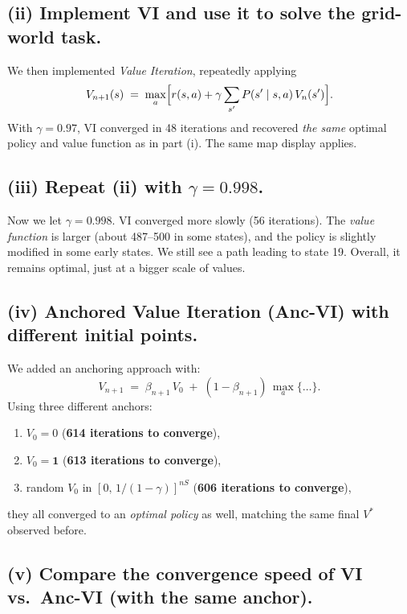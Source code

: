 \subsection*{(ii) Implement VI and use it to solve the grid-world task.}

\noindent
We then implemented \emph{Value Iteration}, repeatedly applying
\[
  V_{n+1}(s) 
   \;=\;\max_{a}\Bigl[r(s,a) + \gamma\sum_{s'}P(s'\mid s,a)\,V_{n}(s')\Bigr].
\]
With \(\gamma=0.97\), VI converged in 48 iterations and recovered \emph{the same} 
optimal policy and value function as in part (i).  The same map display applies.

\subsection*{(iii) Repeat (ii) with \(\gamma=0.998\).}

\noindent
Now we let \(\gamma=0.998\).  VI converged more slowly (56 iterations). 
The \emph{value function} is larger (about 487--500 in some states), 
and the policy is slightly modified in some early states.  
We still see a path leading to state 19. 
Overall, it remains optimal, just at a bigger scale of values.

\subsection*{(iv) Anchored Value Iteration (Anc-VI) with different initial points.}

\noindent
We added an anchoring approach with:
\[
  V_{n+1} 
   \;=\;\beta_{n+1}\,V_0 \;+\;(1-\beta_{n+1})\,\max_{a}\{\dots\}.
\]
Using three different anchors:
\begin{enumerate}[label=(\alph*)]
\item $V_0=0$ \quad(\textbf{614 iterations to converge}),
\item $V_0= \mathbf{1}$ \quad(\textbf{613 iterations to converge}),
\item random $V_0$ in $[0,\,1/(1-\gamma)]^{nS}$ \quad(\textbf{606 iterations to converge}),
\end{enumerate}
they all converged to an \emph{optimal policy} as well, matching the same final $V^*$ observed before.  

\subsection*{(v) Compare the convergence speed of VI vs.\ Anc-VI (with the same anchor).}

